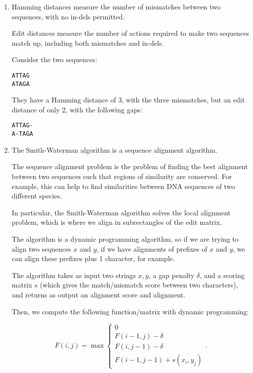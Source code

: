 


\begin{enumerate}[label=(\alph*)]

  \item
    Hamming distances measure the number of mismatches between two sequences, with no in-dels permitted.

    Edit distances measure the number of actions required to make two sequences match up, including both mismatches and in-dels.

    Consider the two sequences:

\begin{verbatim}
ATTAG
ATAGA
\end{verbatim}

They have a Hamming distance of 3, with the three mismatches, but an edit distance of only 2, with the following gaps:

\begin{verbatim}
ATTAG-
A-TAGA
\end{verbatim}

\item
The Smith-Waterman algorithm is a sequence alignment algorithm.

The sequence alignment problem is the problem of finding the best alignment between two sequences such that regions of similarity are conserved. For example, this can help to find similarities between DNA sequences of two different species.

In particular, the Smith-Waterman algorithm solves the local alignment problem, which is where we align in subrectangles of the edit matrix.

The algorithm is a dynamic programming algorithm, so if we are trying to align two sequences $x$ and $y$, if we have alignments of prefixes of $x$ and $y$, we can align these prefixes plus 1 character, for example.

The algorithm takes as input two strings $x, y$, a gap penalty $\delta$, and a scoring matrix $s$ (which gives the match/mismatch score between two characters), and returns as output an alignment score and alignment.

Then, we compute the following function/matrix with dynamic programming:

\[
  F(i,j) = \max\begin{cases}0\\F(i-1, j) - \delta\\F(i, j-1) - \delta\\F(i-1, j-1)+ s(x_i, y_j)\end{cases}
.\] 


\end{enumerate}
